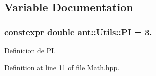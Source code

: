 \subsection{Variable Documentation}
\hypertarget{namespaceant_1_1_utils_ae9b5ccdeb3ee02a6f4f26c1e2a6f02be}{
\subsubsection[{P\+I}]{\setlength{\rightskip}{0pt plus 5cm}constexpr double ant\+::\+Utils\+::\+P\+I = 3.}}\label{namespaceant_1_1_utils_ae9b5ccdeb3ee02a6f4f26c1e2a6f02be}


Definicion de P\+I. 



Definition at line 11 of file Math.\+hpp.

